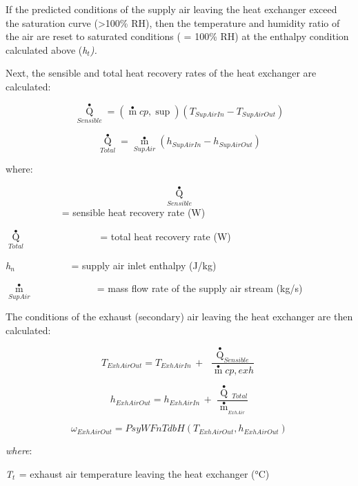 If the predicted conditions of the supply air leaving the heat exchanger exceed the saturation curve (\textgreater{}100\% RH), then the temperature and humidity ratio of the air are reset to saturated conditions ( = 100\% RH) at the enthalpy condition calculated above (\emph{h\(_{t}\)).}

Next, the sensible and total heat recovery rates of the heat exchanger are calculated:

\begin{equation}
{\mathop Q\limits^ \bullet_{Sensible}} = \left( {\mathop m\limits^ \bullet  cp,\sup } \right)({T_{SupAirIn}} - {T_{SupAirOut}})
\end{equation}

\begin{equation}
{\mathop Q\limits^ \bullet_{Total}} = {\mathop m\limits^ \bullet_{SupAir}}({h_{SupAirIn}} - {h_{SupAirOut}})
\end{equation}

where:

\[{\mathop Q\limits^ \bullet_{Sensible}}\] ~~~~~~~~~~~ = sensible heat recovery rate (W)

\({\mathop Q\limits^ \bullet_{Total}}\) ~~~~~~~~~~~~~~ = total heat recovery rate (W)

\emph{h\(_{n}\)}~~~~~~~~~~~ = supply air inlet enthalpy (J/kg)

\({\mathop m\limits^ \bullet_{SupAir}}\) ~~~~~~~~~~~~ = mass flow rate of the supply air stream (kg/s)

The conditions of the exhaust (secondary) air leaving the heat exchanger are then calculated:

\begin{equation}
{T_{ExhAirOut}} = {T_{ExhAirIn}}\, + \,\,\frac{{{{\mathop Q\limits^ \bullet  }_{Sensible}}}}{{\mathop m\limits^ \bullet  cp,exh}}
\end{equation}

\begin{equation}
{h_{ExhAirOut}} = {h_{ExhAirIn}}\, + \,\,\frac{{\mathop Q\limits^ \bullet  {\,_{Total}}}}{{{{\mathop m\limits^ \bullet  }_{_{ExhAir}}}}}
\end{equation}

\begin{equation}
{\omega_{ExhAirOut}} = PsyWFnTdbH({T_{ExhAirOut}},{h_{ExhAirOut}})
\end{equation}

\emph{where}:

\emph{T\(_{t}\)}\(_{ }\) = exhaust air temperature leaving the heat exchanger (°C)


